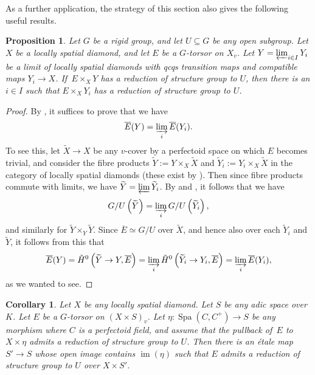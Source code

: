 \documentclass[10pt,a4paper]{article}
\newtheorem{Proposition}[thm]{Proposition}
\newtheorem{Corollary}[thm]{Corollary}
\theoremstyle{definition}
\theoremstyle{remark}
\newcommand{\im}{\operatorname{im}}
\newcommand{\Spa}{\operatorname{Spa}}
\newcommand{\wt}{\widetilde}
\newcommand{\cH}{{\ifmmode \check{H}\else{\v{C}ech}\fi}}
\numberwithin{equation}{section}
\begin{document}
As a further application, the strategy of this section also gives  the following useful results. 

\begin{Proposition}\label{p:reduction-of-strgrp-in-tilde-limits}
	Let $G$ be a rigid group, and let $U\subseteq G$ be any open subgroup.
	Let $X$ be a locally spatial diamond, and let $E$ be a $G$-torsor on $X_v$. Let $Y=\varprojlim_{i\in I} Y_i$ be a limit of locally spatial diamonds with qcqs transition maps and compatible maps $Y_i\to X$. If\, $E\times_XY$ has a reduction of structure group to $U$, then there is an $i\in I$ such that $E\times_XY_i$ has a reduction of structure group to $U$.
\end{Proposition}

\begin{proof}
	By , it suffices to prove that we have
	\[ \overline{E}(Y)=\varinjlim_i \overline E(Y_i).\]
	To see this, let $\wt X\to X$ be any $v$-cover by a perfectoid space on which $E$ becomes trivial, and consider the fibre products $\wt Y:=Y\times_X\wt X$ and $\wt Y_i:=Y_i\times_X\wt X$ in the category of locally spatial diamonds (these exist by \cite[Corollary 11.29]{etale-cohomology-of-diamonds}). Then since fibre products commute with limits, we have $\wt Y=\varprojlim \wt Y_i$. By  and  ,   it follows that we have
	\[ G/U\left(\wt Y\right)=\varinjlim_i G/U\left(\wt Y_i\right),\]
	and similarly for $\wt Y\times_Y\wt Y$.
	Since $\overline{E}\simeq G/U$ over $\wt X$, and hence also over each $\wt Y_i$ and $\wt Y$,  it follows from this that
	\[ \overline{E}(Y)=\cH^0\left(\wt Y\to Y,\overline{E}\right)=\varinjlim_i \cH^0\left(\wt Y_i\to Y_i,\overline{E}\right)=\varinjlim_i\overline{E}(Y_i),\]
	as we wanted to see.
\end{proof}

\begin{Corollary}
	Let $X$ be any locally spatial diamond. Let $S$ be any adic space over $K$. Let $E$ be a $G$-torsor on $(X\times S)_v$. Let $\eta\colon \Spa(C,C^+)\to S$ be any morphism where $C$ is a perfectoid field, and assume that the pullback of\, $E$ to $X\times \eta$ admits a reduction of structure group to $U$. Then there is an \'etale map $S'\to S$ whose open image contains $\im(\eta)$ such that $E$ admits a reduction of structure group to $U$ over $X\times S'$.
\end{Corollary}
\end{document}
